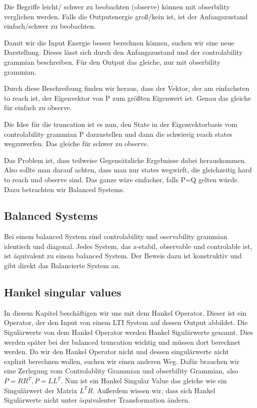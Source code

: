 \documentclass[]{article}
\begin{document}
Die Begriffe leicht/ schwer zu beobachten (observe) können mit obserbility verglichen werden.  Falls die Outputenergie groß/kein ist, ist der Anfangszustand einfach/schwer zu beobachten. 
 
Damit wir die Input Energie besser berechnen können, suchen wir eine neue Darstellung. Dieses lässt sich durch den Anfangszustand und der controlability grammian beschreiben. Für den Output das gleiche, nur mit obserbility grammian. 

Durch diese Beschreibung finden wir heraus, dass der Vektor, der am einfachsten to reach ist, der Eigenvektor von P zum größten Eigenwert ist. Genau das gleiche für einfach zu observe. 

Die Idee für die truncation ist es nun, den State in der Eigenvektorbasis vom controlability grammian P darzustellen und dann die schwierig reach states wegzuwerfen. Das gleiche für schwer zu observe. 

Das Problem ist, dass teilweise Gegensätzliche Ergebnisse dabei herauskommen. Also sollte man darauf achten, dass man nur states wegwirft, die gleichzeitig hard to reach und observe sind. Das ganze wäre einfacher, falls P=Q gelten würde. Dazu betrachten wir Balanced Systems.

\subsection{Balanced Systems}
Bei einem balanced System sind controlability und oservability grammian identisch und diagonal. Jedes System, das a-stabil, observable und controlable ist, ist äquivalent zu einem balanced System. Der Beweis dazu ist konstruktiv und gibt direkt das Balancierte System an. 
 
\subsection{Hankel singular values}

In diesem Kapitel beschäftigen wir uns mit dem Hankel Operator. Dieser ist ein Operator, der den Input von einem LTI System auf dessen Output abbildet. Die Sigulärwerte von dem Hankel Operator werden Hankel Sigulärwerte genannt. Dies werden später bei der balanced truncation wichtig und müssen dort berechnet werden. Da wir den Hankel Operator nicht und dessen singulärwerte nicht explizit berechnen wollen, suchen wir einen anderen Weg. Dafür brauchen wir eine Zerlegung vom Controlablity Grammian und obserbility Grammian, also $P=RR^T, P=LL^T$. Nun ist ein Hankel Singular Value das gleiche wie ein Singulärwert der Matrix $L^TR$. 
Außerdem wissen wir, dass sich Hankel Sigulärwerte nicht unter äquivalenter Transformation ändern. 
\end{document}

